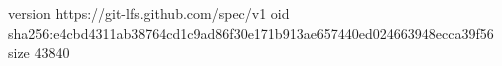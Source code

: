 version https://git-lfs.github.com/spec/v1
oid sha256:e4cbd4311ab38764cd1c9ad86f30e171b913ae657440ed024663948ecca39f56
size 43840
